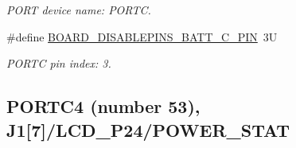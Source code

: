 \begin{DoxyCompactItemize}
\begin{DoxyCompactList}\small\item\em P\+O\+RT device name\+: P\+O\+R\+TC. \end{DoxyCompactList}\item 
\mbox{\label{group__pin__mux_ga55f1653276feec200ea2c1170e94f11a}} 
\#define \mbox{\hyperlink{group__pin__mux_ga55f1653276feec200ea2c1170e94f11a}{B\+O\+A\+R\+D\+\_\+\+D\+I\+S\+A\+B\+L\+E\+P\+I\+N\+S\+\_\+\+B\+A\+T\+T\+\_\+\+C\+\_\+\+P\+IN}}~3U
\begin{DoxyCompactList}\small\item\em P\+O\+R\+TC pin index\+: 3. \end{DoxyCompactList}\end{DoxyCompactItemize}
\subsection*{P\+O\+R\+T\+C4 (number 53), J1\mbox{[}7\mbox{]}/\+L\+C\+D\+\_\+\+P24/\+P\+O\+W\+E\+R\+\_\+\+S\+T\+AT}
